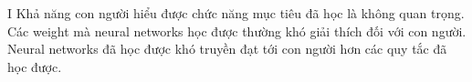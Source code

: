 I Khả năng con người hiểu được chức năng mục tiêu đã học là không quan trọng. Các weight mà neural networks học được thường khó giải thích đối với con người. Neural networks đã học được khó truyền đạt tới con người hơn các quy tắc đã học được.

